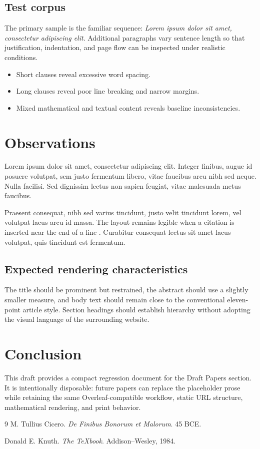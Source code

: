 \documentclass[11pt,a4paper]{article}
\begin{document}
\subsection{Test corpus}

The primary sample is the familiar sequence: \emph{Lorem ipsum dolor sit amet, consectetur adipiscing elit}. Additional paragraphs vary sentence length so that justification, indentation, and page flow can be inspected under realistic conditions.

\begin{itemize}
\item Short clauses reveal excessive word spacing.
\item Long clauses reveal poor line breaking and narrow margins.
\item Mixed mathematical and textual content reveals baseline inconsistencies.
\end{itemize}

\section{Observations}

Lorem ipsum dolor sit amet, consectetur adipiscing elit. Integer finibus, augue id posuere volutpat, sem justo fermentum libero, vitae faucibus arcu nibh sed neque. Nulla facilisi. Sed dignissim lectus non sapien feugiat, vitae malesuada metus faucibus.

Praesent consequat, nibh sed varius tincidunt, justo velit tincidunt lorem, vel volutpat lacus arcu id massa. The layout remains legible when a citation is inserted near the end of a line \cite{knuth1984}. Curabitur consequat lectus sit amet lacus volutpat, quis tincidunt est fermentum.

\subsection{Expected rendering characteristics}

The title should be prominent but restrained, the abstract should use a slightly smaller measure, and body text should remain close to the conventional eleven-point article style. Section headings should establish hierarchy without adopting the visual language of the surrounding website.

\section{Conclusion}

This draft provides a compact regression document for the Draft Papers section. It is intentionally disposable: future papers can replace the placeholder prose while retaining the same Overleaf-compatible workflow, static URL structure, mathematical rendering, and print behavior.

\begin{thebibliography}{9}
M. Tullius Cicero.
\emph{De Finibus Bonorum et Malorum}.
45 BCE.

Donald E. Knuth.
\emph{The TeXbook}.
Addison--Wesley, 1984.
\end{thebibliography}
\end{document}
